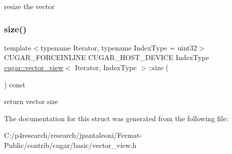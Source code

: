 resize the vector \mbox{\label{structcugar_1_1vector__view_a773841d0e535b07e40a99891e22d937e}} 
\subsubsection{\texorpdfstring{size()}{size()}}
{\footnotesize\ttfamily template$<$typename Iterator, typename Index\+Type = uint32$>$ \\
C\+U\+G\+A\+R\+\_\+\+F\+O\+R\+C\+E\+I\+N\+L\+I\+NE C\+U\+G\+A\+R\+\_\+\+H\+O\+S\+T\+\_\+\+D\+E\+V\+I\+CE Index\+Type \hyperlink{structcugar_1_1vector__view}{cugar\+::vector\+\_\+view}$<$ Iterator, Index\+Type $>$\+::size (\begin{DoxyParamCaption}{ }\end{DoxyParamCaption}) const\hspace{0.3cm}{\ttfamily [inline]}}

return vector size 

The documentation for this struct was generated from the following file\+:\begin{DoxyCompactItemize}
\item 
C\+:/p4research/research/jpantaleoni/\+Fermat-\/\+Public/contrib/cugar/basic/vector\+\_\+view.\+h\end{DoxyCompactItemize}
